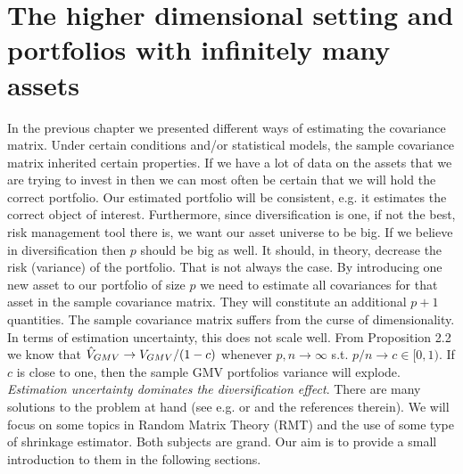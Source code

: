 \documentclass[]{book}\usepackage{knitr}
\begin{document}
\chapter{The higher dimensional setting and portfolios with infinitely many assets}\label{ch:highdim}

In the previous chapter we presented different ways of estimating the covariance matrix. Under certain conditions and/or statistical models, the sample covariance matrix inherited certain properties. 
If we have a lot of data on the assets that we are trying to invest in then we can most often be certain that we will hold the correct portfolio.
Our estimated portfolio will be consistent, e.g. it estimates the correct object of interest. 
Furthermore, since diversification is one, if not the best, risk management tool there is, we want our asset universe to be big.
If we believe in diversification then $p$ should be big as well. 
It should, in theory, decrease the risk (variance) of the portfolio. 
That is not always the case.
By introducing one new asset to our portfolio of size $p$ we need to estimate all covariances for that asset in the sample covariance matrix. They will constitute an additional $p+1$ quantities. 
The sample covariance matrix suffers from the curse of dimensionality. 
In terms of estimation uncertainty, this does not scale well.
From \citet{bodnar2016optimal} Proposition 2.2 we know that $\hat{V}_{GMV} \rightarrow V_{GMV}/(1-c)$ whenever $p,n \rightarrow \infty$ s.t. $p/n \rightarrow c \in [0,1)$. If $c$ is close to one, then the sample GMV portfolios variance will explode. \textit{Estimation uncertainty dominates the diversification effect}. There are many solutions to the problem at hand (see e.g. \citet{lw17} or \citet{bodnar2021recent} and the references therein). We will focus on some topics in Random Matrix Theory (RMT) and the use of some type of shrinkage estimator. Both subjects are grand. Our aim is to provide a small introduction to them in the following sections.
\end{document}
